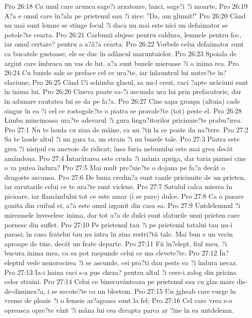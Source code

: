 Pro 26:18  Ca unul care arunca sage?i arzatoare, lanci, sage?i ?i moarte,
Pro 26:19  A?a e omul care în?ala pe prietenul sau ?i zice: "Da, am glumit!"
Pro 26:20  Când nu mai sunt lemne se stinge focul ?i daca nu mai este nici un defaimator se potole?te cearta.
Pro 26:21  Carbunii slujesc pentru caldura, lemnele pentru foc, iar omul certare? pentru a a?â?a cearta.
Pro 26:22  Vorbele celui defaimator sunt ca bucatele gustoase; ele se duc în adâncul maruntaielor.
Pro 26:23  Spoiala de argint care îmbraca un vas de lut, a?a sunt buzele mieroase ?i o inima rea.
Pro 26:24  Cu buzele sale se preface cel ce ura?te, iar înlauntrul lui nutre?te în?elaciune;
Pro 26:25  Când î?i schimba glasul, sa nu-l crezi, caci ?apte urâciuni sunt în inima lui.
Pro 26:26  Cineva poate sa-?i ascunda ura lui prin prefacatorie, dar în adunare rautatea lui se da pe fa?a.
Pro 26:27  Cine sapa groapa (altuia) cade singur în ea ?i cel ce rostogole?te o piatra se pravale?te (tot) peste el.
Pro 26:28  Limba mincinoasa ura?te adevarul ?i gura lingu?itorilor pricinuie?te prabu?irea.
Pro 27:1  Nu te lauda cu ziua de mâine, ca nu ?tii la ce poate da na?tere.
Pro 27:2  Sa te laude altul ?i nu gura ta, un strain ?i nu buzele tale.
Pro 27:3  Piatra este grea ?i nisipul cu anevoie de ridicat; însa furia nebunului este mai grea decât amândoua.
Pro 27:4  Întarâtarea este cruda ?i mânia apriga, dar taria pizmei cine o va putea îndura?
Pro 27:5  Mai mult pre?uie?te o dojana pe fa?a decât o dragoste ascunsa.
Pro 27:6  De buna credin?a sunt ranile pricinuite de un prieten, iar sarutarile celui ce te ura?te sunt viclene.
Pro 27:7  Satulul calca mierea în picioare, iar flamândului tot ce este amar (i se pare) dulce.
Pro 27:8  Ca o pasare gonita din cuibul ei, a?a este omul izgonit din casa sa.
Pro 27:9  Untdelemnul ?i miresmele înveselesc inima, dar tot a?a de dulci sunt sfaturile unui prieten care pornesc din suflet.
Pro 27:10  Pe prietenul tau ?i pe prietenul tatalui tau nu-i parasi; în casa fratelui tau nu intra în ziua restri?tii tale. Mai bun e un vecin aproape de tine, decât un frate departe.
Pro 27:11  Fii în?elept, fiul meu, ?i bucura inima mea, ca sa pot raspunde celui ce ma clevete?te.
Pro 27:12  În?eleptul vede nenorocirea ?i se ascunde, cei pro?ti dau peste ea ?i îndura necaz.
Pro 27:13  Ia-i haina caci s-a pus cheza? pentru altul ?i cere-i zalog din pricina celor straini.
Pro 27:14  Celui ce binecuvânteaza pe prietenul sau cu glas mare dis-de-diminea?a, i se socote?te ca un blestem.
Pro 27:15  Un jgheab care curge în vreme de ploaie ?i o femeie ar?agoasa sunt la fel;
Pro 27:16  Cel care vrea s-o opreasca opre?te vânt ?i mâna lui cea dreapta parca ar ?ine în ea untdelemn.
